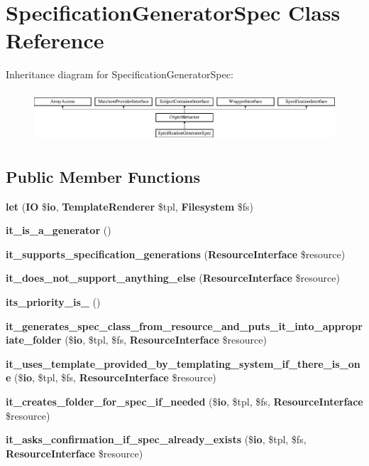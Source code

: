 \section{Specification\+Generator\+Spec Class Reference}
\label{classspec_1_1_php_spec_1_1_code_generator_1_1_generator_1_1_specification_generator_spec}
Inheritance diagram for Specification\+Generator\+Spec\+:\begin{figure}[H]
\begin{center}
\leavevmode
\includegraphics[height=1.877095cm]{classspec_1_1_php_spec_1_1_code_generator_1_1_generator_1_1_specification_generator_spec}
\end{center}
\end{figure}
\subsection*{Public Member Functions}
\begin{DoxyCompactItemize}
\item 
{\bf let} ({\bf I\+O} \${\bf io}, {\bf Template\+Renderer} \$tpl, {\bf Filesystem} \$fs)
\item 
{\bf it\+\_\+is\+\_\+a\+\_\+generator} ()
\item 
{\bf it\+\_\+supports\+\_\+specification\+\_\+generations} ({\bf Resource\+Interface} \$resource)
\item 
{\bf it\+\_\+does\+\_\+not\+\_\+support\+\_\+anything\+\_\+else} ({\bf Resource\+Interface} \$resource)
\item 
{\bf its\+\_\+priority\+\_\+is\+\_} ()
\item 
{\bf it\+\_\+generates\+\_\+spec\+\_\+class\+\_\+from\+\_\+resource\+\_\+and\+\_\+puts\+\_\+it\+\_\+into\+\_\+appropriate\+\_\+folder} (\${\bf io}, \$tpl, \$fs, {\bf Resource\+Interface} \$resource)
\item 
{\bf it\+\_\+uses\+\_\+template\+\_\+provided\+\_\+by\+\_\+templating\+\_\+system\+\_\+if\+\_\+there\+\_\+is\+\_\+one} (\${\bf io}, \$tpl, \$fs, {\bf Resource\+Interface} \$resource)
\item 
{\bf it\+\_\+creates\+\_\+folder\+\_\+for\+\_\+spec\+\_\+if\+\_\+needed} (\${\bf io}, \$tpl, \$fs, {\bf Resource\+Interface} \$resource)
\item 
{\bf it\+\_\+asks\+\_\+confirmation\+\_\+if\+\_\+spec\+\_\+already\+\_\+exists} (\${\bf io}, \$tpl, \$fs, {\bf Resource\+Interface} \$resource)
\end{DoxyCompactItemize}
